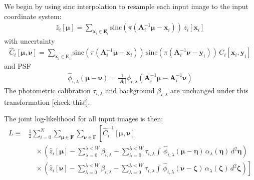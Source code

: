 \documentclass[DM,authoryear,toc]{lsstdoc}
\newcommand{\todo}[1]{{\color{red}[#1]}}
\begin{document}
We begin by using sinc interpolation to resample each input image to the input coordinate system:
\begin{align}
    \hat{z}_{i}[\bm{\mu}] =
        \sum_{\bm{x}_i \in \bm{E}_i}
            \mathrm{sinc}(\pi(\bm{A}_i^{-1}\bm{\mu} - \bm{x}_i))
            \, z_{i}[\bm{x}_i]
\end{align}
with uncertainty
\begin{align}
    \hat{C}_{i}[\bm{\mu}, \bm{\nu}] =
        \sum_{\bm{x}_i \in \bm{E}_i}
            \mathrm{sinc}(\pi(\bm{A}_i^{-1}\bm{\mu} - \bm{x}_i))
            \,\mathrm{sinc}(\pi(\bm{A}_i^{-1}\bm{\nu} - \bm{y}_i))
            \, C_{i}[\bm{x}_i, \bm{y}_i]
\end{align}
and PSF
\begin{align}
    \hat{\phi}_{i,\lambda}(\bm{\mu}-\bm{\nu}) =
        \frac{1}{|A_i|}
        \phi_{i,\lambda}(\bm{A}_i^{-1}\bm{\mu} - \bm{A}_i^{-1}\bm{\nu})
\end{align}
The photometric calibration $\tau_{i,\lambda}$ and background $\beta_{i,\lambda}$ are unchanged under this transformation \todo{check this!}.

The joint log-likelihood for all input images is then:
\begin{align}
L \equiv &
    \frac{1}{2} \sum_{i=0}^{N}
        \sum_{\bm{\mu} \in \bm{F}}
        \sum_{\bm{\nu} \in \bm{F}}
        \left[
        \hat{C}_i^{-1}[\bm{\mu}, \bm{\nu}]
        \right.
        \\
    & \quad \times
        \left(
            \hat{z}_i[\bm{\mu}]
            - \sum_{\lambda=0}^{\lambda < W} \beta_{i,\lambda}
            - \sum_{\lambda=0}^{\lambda < W} \tau_{i,\lambda}
                \int\!
                \, \hat{\phi}_{i,\lambda}(\bm{\mu} - \bm{\eta})
                \, \alpha_{\lambda}(\bm{\eta})
                \, d^2\bm{\eta}
        \right) \\
    & \quad \times
    \left.
        \left(
            \hat{z}_i[\bm{\nu}]
            - \sum_{\lambda=0}^{\lambda < W} \beta_{i,\lambda}
            - \sum_{\lambda=0}^{\lambda < W} \tau_{i,\lambda}
                \int\!
                \, \hat{\phi}_{i,\lambda}(\bm{\nu} - \bm{\zeta})
                \, \alpha_{\lambda}(\bm{\zeta})
                \, d^2\bm{\zeta}
        \right)
    \right]
\end{align}
\end{document}

